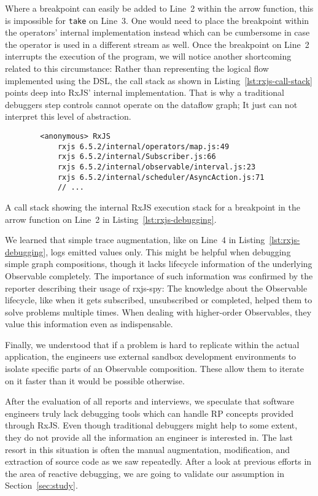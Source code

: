 \documentclass[sigplan,screen,review]{acmart}
\begin{document}
Where a breakpoint can easily be added to Line~2 within the arrow function, this is impossible for \texttt{take} on Line~3. One would need to place the breakpoint within the operators' internal implementation instead which can be cumbersome in case the operator is used in a different stream as well. Once the breakpoint on Line~2 interrupts the execution of the program, we will notice another shortcoming related to this circumstance: Rather than representing the logical flow implemented using the DSL, the call stack as shown in Listing~\ref{lst:rxjs-call-stack} points deep into RxJS' internal implementation. That is why a traditional debuggers step controls cannot operate on the dataflow graph; It just can not interpret this level of abstraction.

\begin{listing}
	\begin{verbatim}
		<anonymous> RxJS
			rxjs 6.5.2/internal/operators/map.js:49
			rxjs 6.5.2/internal/Subscriber.js:66
			rxjs 6.5.2/internal/observable/interval.js:23
			rxjs 6.5.2/internal/scheduler/AsyncAction.js:71
			// ...
	\end{verbatim}
	\caption{A call stack showing the internal RxJS execution stack for a breakpoint in the arrow function on Line~2 in Listing~\ref{lst:rxjs-debugging}.}
	\label{lst:rxjs-call-stack}
\end{listing}

We learned that simple trace augmentation, like on Line~4 in Listing~\ref{lst:rxjs-debugging}, logs emitted values only. This might be helpful when debugging simple graph compositions, though it lacks lifecycle information of the underlying Observable completely. The importance of such information was confirmed by the reporter describing their usage of rxjs-spy: The knowledge about the Observable lifecycle, like when it gets subscribed, unsubscribed or completed, helped them to solve problems multiple times. When dealing with higher-order Observables, they value this information even as indispensable.

Finally, we understood that if a problem is hard to replicate within the actual application, the engineers use external sandbox development environments to isolate specific parts of an Observable composition. These allow them to iterate on it faster than it would be possible otherwise.

After the evaluation of all reports and interviews, we speculate that software engineers truly lack debugging tools which can handle RP concepts provided through RxJS. Even though traditional debuggers might help to some extent, they do not provide all the information an engineer is interested in. The last resort in this situation is often the manual augmentation, modification, and extraction of source code as we saw repeatedly. After a look at previous efforts in the area of reactive debugging, we are going to validate our assumption in Section~\ref{sec:study}.
\end{document}
